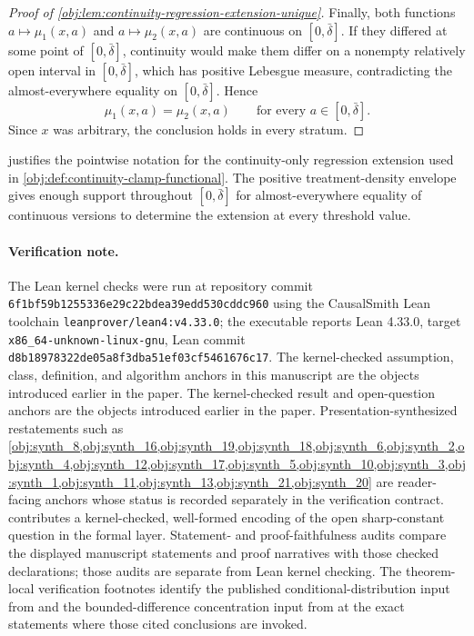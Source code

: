 \documentclass[11pt]{article}
\begin{document}
\begin{proof}[Proof of \cref{obj:lem:continuity-regression-extension-unique}]
Finally, both functions \(a\mapsto\mu_1(x,a)\) and \(a\mapsto\mu_2(x,a)\) are continuous on \([0,\bar\delta]\).  If they differed at some point of \([0,\bar\delta]\), continuity would make them differ on a nonempty relatively open interval in \([0,\bar\delta]\), which has positive Lebesgue measure, contradicting the almost-everywhere equality on \([0,\bar\delta]\).  Hence
\[
\mu_1(x,a)=\mu_2(x,a)
\qquad\text{for every }a\in[0,\bar\delta].
\]%
Since \(x\) was arbitrary, the conclusion holds in every stratum.
\end{proof}

 justifies the pointwise notation for the continuity-only regression extension used in \cref{obj:def:continuity-clamp-functional}. The positive treatment-density envelope gives enough support throughout \([0,\bar\delta]\) for almost-everywhere equality of continuous versions to determine the extension at every threshold value.

\paragraph{Verification note.}
The Lean kernel checks were run at repository commit \texttt{6f1bf59b1255336e29c22bdea39edd530cddc960} using the CausalSmith Lean toolchain \texttt{leanprover/lean4:v4.33.0}; the executable reports Lean 4.33.0, target \texttt{x86\_64-unknown-linux-gnu}, Lean commit \texttt{d8b18978322de05a8f3dba51ef03cf5461676c17}. The kernel-checked assumption, class, definition, and algorithm anchors in this manuscript are the objects introduced earlier in the paper. The kernel-checked result and open-question anchors are the objects introduced earlier in the paper. Presentation-synthesized restatements such as \cref{obj:synth_8,obj:synth_16,obj:synth_19,obj:synth_18,obj:synth_6,obj:synth_2,obj:synth_4,obj:synth_12,obj:synth_17,obj:synth_5,obj:synth_10,obj:synth_3,obj:synth_1,obj:synth_11,obj:synth_13,obj:synth_21,obj:synth_20} are reader-facing anchors whose status is recorded separately in the verification contract.  contributes a kernel-checked, well-formed encoding of the open sharp-constant question in the formal layer. Statement- and proof-faithfulness audits compare the displayed manuscript statements and proof narratives with those checked declarations; those audits are separate from Lean kernel checking. The theorem-local verification footnotes identify the published conditional-distribution input from \citet{Kallenberg2002Foundations} and the bounded-difference concentration input from \citet{Hoeffding1963} at the exact statements where those cited conclusions are invoked.
\end{document}

